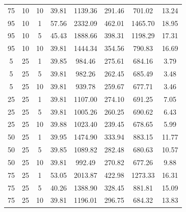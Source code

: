 \begin{table}[H]
\begin{tabular}{ccc|c|c|c|c|c}
75 & 10 & 10 & \cellcolor{gray!50}39.81 & \cellcolor{gray!1}1139.36 & \cellcolor{gray!1}291.46 & \cellcolor{gray!38}701.02 & 13.24\\
95 & 10 & 1 & \cellcolor{gray!1}57.56 & \cellcolor{gray!1}2332.09 & \cellcolor{gray!1}462.01 & \cellcolor{gray!1}1465.70 & 18.95\\
95 & 10 & 5 & \cellcolor{gray!1}45.43 & \cellcolor{gray!1}1888.66 & \cellcolor{gray!1}398.31 & \cellcolor{gray!1}1198.29 & 17.31\\
95 & 10 & 10 & \cellcolor{gray!50}39.81 & \cellcolor{gray!1}1444.34 & \cellcolor{gray!1}354.56 & \cellcolor{gray!10}790.83 & 16.69\\
5 & 25 & 1 & \cellcolor{gray!50}39.85 & \cellcolor{gray!7}984.46 & \cellcolor{gray!1}275.61 & \cellcolor{gray!43}684.16 & 3.79\\
5 & 25 & 5 & \cellcolor{gray!50}39.81 & \cellcolor{gray!8}982.26 & \cellcolor{gray!1}262.45 & \cellcolor{gray!43}685.49 & 3.48\\
5 & 25 & 10 & \cellcolor{gray!50}39.81 & \cellcolor{gray!15}939.78 & \cellcolor{gray!1}259.67 & \cellcolor{gray!45}677.71 & 3.46\\
25 & 25 & 1 & \cellcolor{gray!50}39.81 & \cellcolor{gray!1}1107.00 & \cellcolor{gray!1}274.10 & \cellcolor{gray!41}691.25 & 7.05\\
25 & 25 & 5 & \cellcolor{gray!50}39.81 & \cellcolor{gray!4}1005.26 & \cellcolor{gray!1}260.25 & \cellcolor{gray!41}690.62 & 6.43\\
25 & 25 & 10 & \cellcolor{gray!50}39.88 & \cellcolor{gray!1}1023.40 & \cellcolor{gray!1}239.45 & \cellcolor{gray!45}678.65 & 5.99\\
50 & 25 & 1 & \cellcolor{gray!49}39.95 & \cellcolor{gray!1}1474.90 & \cellcolor{gray!1}333.94 & \cellcolor{gray!1}883.15 & 11.77\\
50 & 25 & 5 & \cellcolor{gray!50}39.85 & \cellcolor{gray!1}1089.82 & \cellcolor{gray!1}282.48 & \cellcolor{gray!44}680.63 & 10.57\\
50 & 25 & 10 & \cellcolor{gray!50}39.81 & \cellcolor{gray!6}992.49 & \cellcolor{gray!1}270.82 & \cellcolor{gray!45}677.26 & 9.88\\
75 & 25 & 1 & \cellcolor{gray!1}53.05 & \cellcolor{gray!1}2013.87 & \cellcolor{gray!1}422.98 & \cellcolor{gray!1}1273.33 & 16.31\\
75 & 25 & 5 & \cellcolor{gray!46}40.26 & \cellcolor{gray!1}1388.90 & \cellcolor{gray!1}328.45 & \cellcolor{gray!1}881.81 & 15.09\\
75 & 25 & 10 & \cellcolor{gray!50}39.81 & \cellcolor{gray!1}1196.01 & \cellcolor{gray!1}296.75 & \cellcolor{gray!43}684.32 & 13.83\\

\end{tabular}
\end{table}
